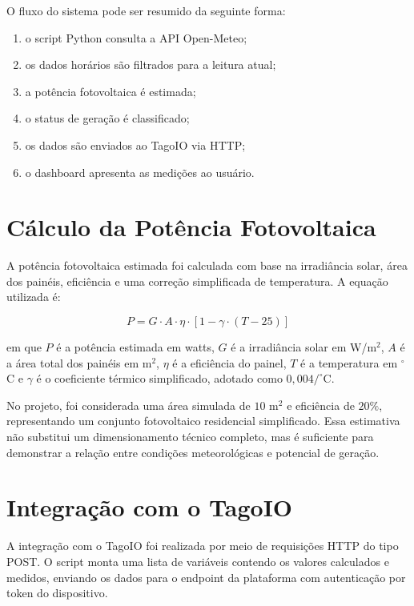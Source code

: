 \documentclass[12pt,a4paper]{article}
\begin{document}
O fluxo do sistema pode ser resumido da seguinte forma:

\begin{enumerate}
    \item o script Python consulta a API Open-Meteo;
    \item os dados horários são filtrados para a leitura atual;
    \item a potência fotovoltaica é estimada;
    \item o status de geração é classificado;
    \item os dados são enviados ao TagoIO via HTTP;
    \item o dashboard apresenta as medições ao usuário.
\end{enumerate}

\section{Cálculo da Potência Fotovoltaica}

A potência fotovoltaica estimada foi calculada com base na irradiância solar, área dos painéis, eficiência e uma correção simplificada de temperatura. A equação utilizada é:

\begin{equation}
P = G \cdot A \cdot \eta \cdot \left[1 - \gamma \cdot (T - 25)\right]
\end{equation}

em que $P$ é a potência estimada em watts, $G$ é a irradiância solar em W/m$^2$, $A$ é a área total dos painéis em m$^2$, $\eta$ é a eficiência do painel, $T$ é a temperatura em $^\circ$C e $\gamma$ é o coeficiente térmico simplificado, adotado como $0{,}004/ ^\circ$C.

No projeto, foi considerada uma área simulada de $10$ m$^2$ e eficiência de $20\%$, representando um conjunto fotovoltaico residencial simplificado. Essa estimativa não substitui um dimensionamento técnico completo, mas é suficiente para demonstrar a relação entre condições meteorológicas e potencial de geração.

\section{Integração com o TagoIO}

A integração com o TagoIO foi realizada por meio de requisições HTTP do tipo POST. O script monta uma lista de variáveis contendo os valores calculados e medidos, enviando os dados para o endpoint da plataforma com autenticação por token do dispositivo.
\end{document}
